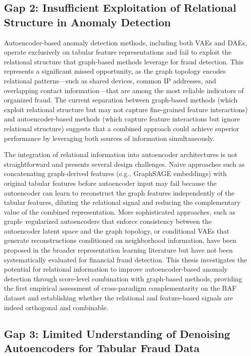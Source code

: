 \subsection{Gap 2: Insufficient Exploitation of Relational Structure in Anomaly
Detection}

Autoencoder-based anomaly detection methods, including both VAEs and DAEs,
operate exclusively on tabular feature representations and fail to exploit the
relational structure that graph-based methods leverage for fraud detection. This
represents a significant missed opportunity, as the graph topology encodes
relational patterns---such as shared devices, common IP addresses, and
overlapping contact information---that are among the most reliable indicators of
organized fraud. The current separation between graph-based methods (which
exploit relational structure but may not capture fine-grained feature
interactions) and autoencoder-based methods (which capture feature interactions
but ignore relational structure) suggests that a combined approach could achieve
superior performance by leveraging both sources of information simultaneously.

The integration of relational information into autoencoder architectures is not
straightforward and presents several design challenges. Naive approaches such as
concatenating graph-derived features (e.g., GraphSAGE embeddings) with original
tabular features before autoencoder input may fail because the autoencoder can
learn to reconstruct the graph features independently of the tabular features,
diluting the relational signal and reducing the complementary value of the
combined representation. More sophisticated approaches, such as graph-
regularized autoencoders that enforce consistency between the autoencoder latent
space and the graph topology, or conditional VAEs that generate reconstructions
conditioned on neighborhood information, have been proposed in the broader
representation learning literature but have not been systematically evaluated
for financial fraud detection. This thesis investigates the potential for
relational information to improve autoencoder-based anomaly detection through
score-level combination with graph-based methods, providing the first empirical
assessment of cross-paradigm complementarity on the BAF dataset and establishing
whether the relational and feature-based signals are indeed orthogonal and
combinable.

\subsection{Gap 3: Limited Understanding of Denoising Autoencoders for Tabular
Fraud Data}

